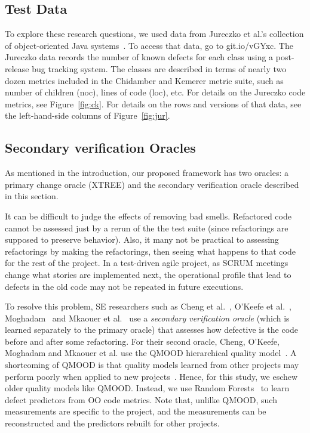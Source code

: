 \documentclass[twocolumn,5p]{elsarticle}
\newcommand{\fig}[1]{Figure~\ref{fig:#1}}
\theoremstyle{break}
\begin{document}
\begin{itemize}
		
		
		
		
		\subsection{Test Data}\label{sect:tesd}
		
		To explore these research questions,
		we used data from
		Jureczko et al.'s collection of object-oriented Java systems~\cite{jureczko10}. To access that data, go to   git.io/vGYxc.
		The Jureczko data records the number of known defects for each class using a post-release bug tracking system. The classes are described in terms of nearly two dozen metrics included in the Chidamber and Kemerer metric suite, such as number of children (noc), lines of code (loc), etc. For details on the Jureczko code
		metrics, see  \fig{ck}. For details on the rows and versions
		of that data, see the left-hand-side columns of \fig{jur}.
		
		
		
		
		\subsection{Secondary verification Oracles}
		\label{sect:eval}
		
		As mentioned in the introduction, our proposed framework has two oracles:
		a primary change oracle (XTREE) and the secondary verification oracle described in this section.
		
		It can be difficult  to judge the  effects of removing bad smells.
		Refactored code cannot be assessed just by a rerun of the the test
		suite (since refactorings are supposed to preserve behavior). 
		Also, it many not be practical
		to assessing refactorings by making the
		refactorings,  then seeing what happens to that code for the rest
		of the project. In a test-driven agile project, as
		SCRUM meetings change what stories are implemented next,
		the operational profile that lead to defects in the old
		code may not be repeated in future executions. 
		
		To resolve this  problem, SE researchers such as 
		Cheng et al.~\cite{Cheng10}, O'Keefe et al.~\cite{OKeeffe08,OKeeffe07},
		Moghadam~\cite{Moghadam2011} and Mkaouer et al.~\cite{Mkaouer14}
		use a {\em secondary verification oracle} (which is learned separately
		to the primary oracle) that   assesses
		how defective is the code before and after some
		refactoring. 
		For their second oracle,
		Cheng, O'Keefe, Moghadam and  Mkaouer et al. use the QMOOD hierarchical
		quality model~\cite{Bansiya02}.
		A shortcoming of QMOOD
		is that quality models learned from other projects
		may perform poorly when applied to new projects~\cite{localvsglobal}.
		Hence, for this study, we  eschew
		older quality models like QMOOD. Instead, we use
		Random Forests~\cite{Breiman2001} to learn defect predictors
		from OO code metrics.
		Note that, unlilke QMOOD, such measurements 
		are specific to the project, and the measurements can be reconstructed and the predictors rebuilt for other projects.
		

\end{itemize}
\end{document}
